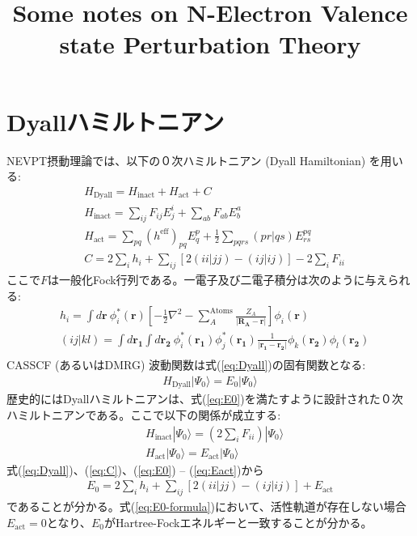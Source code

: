 \documentclass[11pt,pra,aps]{revtex4}
\begin{document}
\title{Some notes on N-Electron Valence state Perturbation Theory}

\maketitle

\section{Dyallハミルトニアン}

NEVPT摂動理論では、以下の０次ハミルトニアン (Dyall Hamiltonian) を用いる:
%
\begin{align}
  & H_\text{Dyall} = H_\text{inact} + H_\text{act} + C \label{eq:Dyall}\\
  & H_\text{inact} = \sum_{ij} F_{ij} E^i_j + \sum_{ab} F_{ab} E^a_b \\ 
  & H_\text{act}   = \sum_{pq} (h^\text{eff})_{pq}E^p_q + \frac{1}{2}\sum_{pqrs} (pr|qs) E^{pq}_{rs} \\ 
  & C = 2\sum_i h_i + \sum_{ij} [2(ii|jj)-(ij|ij)] - 2\sum_i F_{ii}\label{eq:C}
\end{align}
%
ここで$F$は一般化Fock行列である。一電子及び二電子積分は次のように与えられる:
%
\begin{align}
  & h_i = \int d\mathbf{r} \ \phi^{*}_i (\mathbf{r})\left[-\frac{1}{2}\nabla^{2}-\sum_A^\text{Atoms} \frac{Z_A}{|\mathbf{R_A}-\mathbf{r}|}\right]\phi_i(\mathbf{r}) \\
  & (ij|kl) = \int d\mathbf{r_1} \int d\mathbf{r_2} \ \phi^{*}_i (\mathbf{r_1}) \phi^{*}_j (\mathbf{r_1}) \frac{1}{|\mathbf{r_1}-\mathbf{r_2}|} \phi_k(\mathbf{r_2}) \phi_l(\mathbf{r_2}) \\
\end{align}
%
CASSCF (あるいはDMRG) 波動関数は式(\ref{eq:Dyall})の固有関数となる:
%
\begin{align}
  H_\text{Dyall}|\Psi_0\rangle = E_0|\Psi_0\rangle \label{eq:E0}
\end{align}
%
歴史的にはDyallハミルトニアンは、式(\ref{eq:E0})を満たすように設計された０次ハミルトニアンである。ここで以下の関係が成立する:
%
\begin{align}
  & H_\text{inact}|\Psi_0\rangle = \left(2\sum_i F_{ii}\right)|\Psi_0\rangle \label{eq:Einact}\\
  & H_\text{act}|\Psi_0\rangle = E_\text{act}|\Psi_0\rangle \label{eq:Eact}
\end{align}
%
式(\ref{eq:Dyall})、(\ref{eq:C})、(\ref{eq:E0}) -- (\ref{eq:Eact})から
%
\begin{align}
  E_0 = 2\sum_i h_i + \sum_{ij} [2(ii|jj)-(ij|ij)] + E_\text{act} \label{eq:E0-formula}
\end{align}
%
であることが分かる。式(\ref{eq:E0-formula})において、活性軌道が存在しない場合$E_\text{act}=0$となり、$E_0$がHartree-Fockエネルギーと一致することが分かる。
\end{document}
